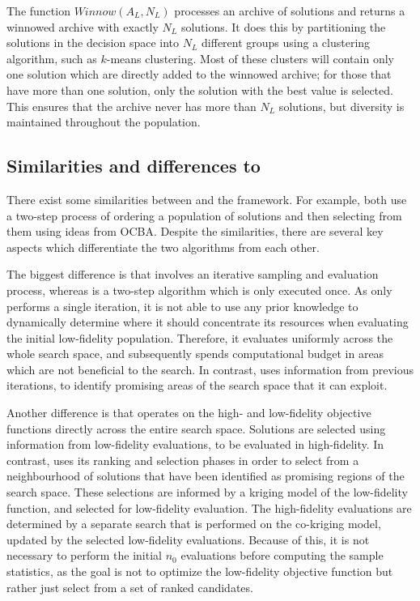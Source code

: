 The function $Winnow(A_L,N_L)$ processes an archive of solutions and returns a winnowed archive with exactly $N_L$ solutions. It does this by partitioning the solutions in the decision space into $N_L$ different groups using a clustering algorithm, such as $k$-means clustering. Most of these clusters will contain only one solution which are directly added to the winnowed archive; for those that have more than one solution, only the solution with the best value is selected. This ensures that the archive never has more than $N_L$ solutions, but diversity is maintained throughout the population.

\subsection{Similarities and differences to \motos{}}
There exist some similarities between \AlgName{} and the \motos{} framework. For example, both use a two-step process of ordering a population of solutions and then selecting from them using ideas from OCBA. Despite the similarities, there are several key aspects which differentiate the two algorithms from each other. 

The biggest difference is that \AlgName{} involves an iterative sampling and evaluation process, whereas \motos{} is a two-step algorithm which is only executed once. As \motos{} only performs a single iteration, it is not able to use any prior knowledge to dynamically determine where it should concentrate its resources when evaluating the initial low-fidelity population. Therefore, it evaluates uniformly across the whole search space, and subsequently spends computational budget in areas which are not beneficial to the search. In contrast, \AlgName{} uses information from previous iterations, to identify promising areas of the search space that it can exploit.

Another difference is that \motos{} operates on the high- and low-fidelity objective functions directly across the entire search space. Solutions are selected using information from low-fidelity evaluations, to be evaluated in high-fidelity. In contrast, \AlgName{} uses its ranking and selection phases in order to select from a neighbourhood of solutions that have been identified as promising regions of the search space. These selections are informed by a kriging model of the low-fidelity function, and selected for low-fidelity evaluation. The high-fidelity evaluations are determined by a separate search that is performed on the co-kriging model, updated by the selected low-fidelity evaluations. Because of this, it is not necessary to perform the initial $n_0$ evaluations before computing the sample statistics, as the goal is not to optimize the low-fidelity objective function but rather just select from a set of ranked candidates.

